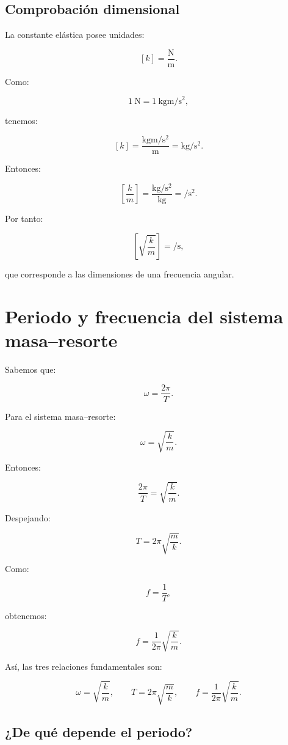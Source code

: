 \subsection{Comprobación dimensional}

La constante elástica posee unidades:

\[ [k]=\frac{\si{\newton}}{\si{\meter}}. \]

Como:

\[ \SI{1}{\newton}=\SI{1}{\kilogram\meter\per\second\squared}, \]

tenemos:

\[
[k]
=
\frac{\si{\kilogram\meter\per\second\squared}}{\si{\meter}}
=
\si{\kilogram\per\second\squared}.
\]

Entonces:

\[
\left[\frac{k}{m}\right]
=
\frac{\si{\kilogram\per\second\squared}}{\si{\kilogram}}
=
\si{\per\second\squared}.
\]

Por tanto:

\[
\left[\sqrt{\frac{k}{m}}\right]
=
\si{\per\second},
\]

que corresponde a las dimensiones de una frecuencia angular.


\section{Periodo y frecuencia del sistema masa--resorte}

Sabemos que:

\[ \omega=\frac{2\pi}{T}. \]

Para el sistema masa--resorte:

\[ \omega=\sqrt{\frac{k}{m}}. \]

Entonces:

\[ \frac{2\pi}{T}=\sqrt{\frac{k}{m}}. \]

Despejando:

\[ \boxed{T=2\pi\sqrt{\frac{m}{k}}}. \]

Como:

\[ f=\frac{1}{T}, \]

obtenemos:

\[ \boxed{f=\frac{1}{2\pi}\sqrt{\frac{k}{m}}}. \]

Así, las tres relaciones fundamentales son:

\[
\boxed{
\omega=\sqrt{\frac{k}{m}},
\qquad
T=2\pi\sqrt{\frac{m}{k}},
\qquad
f=\frac{1}{2\pi}\sqrt{\frac{k}{m}}
}.
\]


\subsection{¿De qué depende el periodo?}

